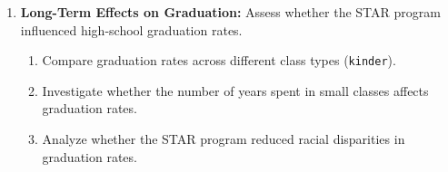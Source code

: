 \documentclass[12pt]{article}
\begin{document}
\begin{enumerate}
    \item \textbf{Long-Term Effects on Graduation:} Assess whether the STAR program influenced high-school graduation rates. 
    \begin{enumerate}
        \item Compare graduation rates across different class types (\texttt{kinder}).
        \item Investigate whether the number of years spent in small classes affects graduation rates.
        \item Analyze whether the STAR program reduced racial disparities in graduation rates.
    \end{enumerate}
\end{enumerate}












\end{document}
